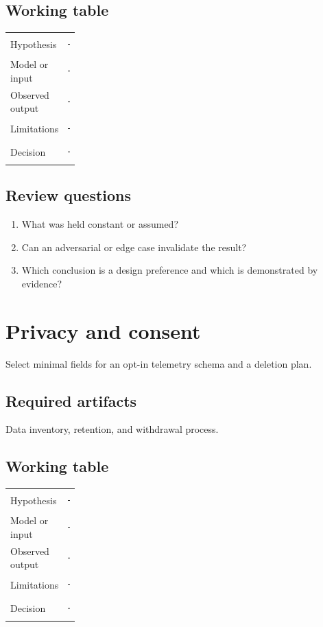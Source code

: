 \documentclass[11pt]{article}
\begin{document}
\subsection{Working table}
\begin{tabularx}{\linewidth}{@{}p{0.20\linewidth}X@{}}\toprule
Hypothesis & \rule{0.90\linewidth}{0.4pt}\\[0.35cm]
Model or input & \rule{0.90\linewidth}{0.4pt}\\[0.35cm]
Observed output & \rule{0.90\linewidth}{0.4pt}\\[0.35cm]
Limitations & \rule{0.90\linewidth}{0.4pt}\\[0.35cm]
Decision & \rule{0.90\linewidth}{0.4pt}\\\bottomrule\end{tabularx}

\subsection{Review questions}
\begin{enumerate}
\item What was held constant or assumed?
\item Can an adversarial or edge case invalidate the result?
\item Which conclusion is a design preference and which is demonstrated by evidence?
\end{enumerate}

\section{Privacy and consent}
Select minimal fields for an opt-in telemetry schema and a deletion plan.


\subsection{Required artifacts}
Data inventory, retention, and withdrawal process.


\subsection{Working table}
\begin{tabularx}{\linewidth}{@{}p{0.20\linewidth}X@{}}\toprule
Hypothesis & \rule{0.90\linewidth}{0.4pt}\\[0.35cm]
Model or input & \rule{0.90\linewidth}{0.4pt}\\[0.35cm]
Observed output & \rule{0.90\linewidth}{0.4pt}\\[0.35cm]
Limitations & \rule{0.90\linewidth}{0.4pt}\\[0.35cm]
Decision & \rule{0.90\linewidth}{0.4pt}\\\bottomrule\end{tabularx}
\end{document}
